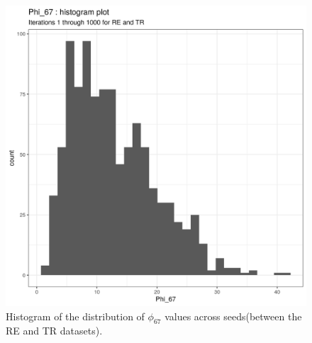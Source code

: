 \documentclass[12pt]{article} %
\begin{document}
	\newpage
	
	
	
	\begin{figure}[h]
		\centering
		\includegraphics[scale=0.75]{Images/Biology_data/Set_1000/All_datasets/Phi_histograms/Phi_67_histogram_plot.png}
		\caption{Histogram of the distribution of $\phi_{67}$ values across seeds(between the RE and TR datasets).}
		\label{fig:results:cedar_2:mdi_re_tr_phi_histogram}
	\end{figure}
	
	\newpage
	
\end{document}
